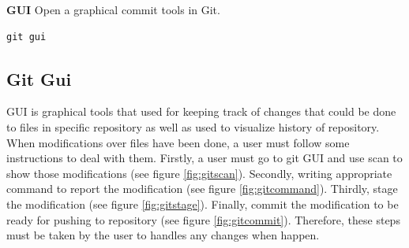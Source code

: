 \documentclass[11pt]{report}
\begin{document}
\textbf{GUI} Open a graphical commit tools in Git.
\begin{verbatim}
git gui
\end{verbatim}


\subsection{Git Gui}
\label{subsec: gitgui}
GUI is graphical tools that used for keeping track of changes that could be done to files in specific repository as well as used to visualize history of repository. When modifications over files have been done, a user must follow some instructions to deal with them. Firstly, a user must go to git GUI and use scan to show those modifications (see figure \ref{fig:gitscan}). Secondly, writing appropriate command to report the modification (see figure \ref{fig:gitcommand}). Thirdly, stage the modification (see figure \ref{fig:gitstage}). Finally, commit the modification to be ready for pushing to repository (see figure \ref{fig:gitcommit}). Therefore, these steps must be taken by the user to handles any changes when happen.
\end{document}
